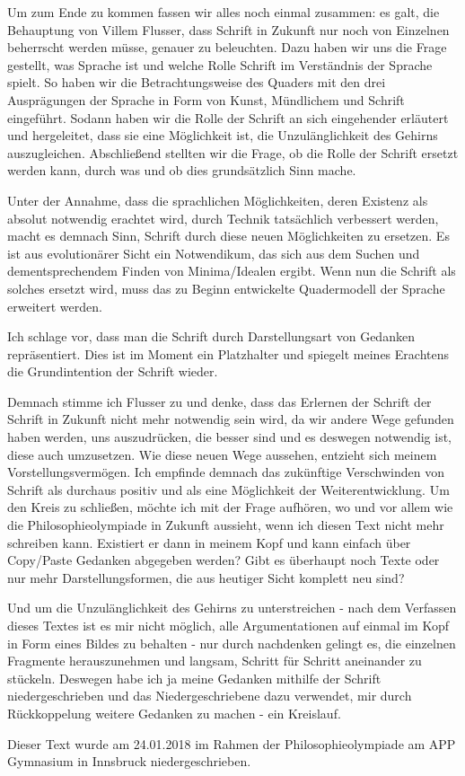 \documentclass[12pt,a4paper,oneside]{article}
\begin{document}
  Um zum Ende zu kommen fassen wir alles noch einmal zusammen: es galt, die Behauptung von Villem Flusser, dass Schrift in Zukunft nur noch von Einzelnen beherrscht werden müsse, genauer zu beleuchten. Dazu haben wir uns die Frage gestellt, was Sprache ist und welche Rolle Schrift im Verständnis der Sprache spielt. So haben wir die Betrachtungsweise des Quaders mit den drei Ausprägungen der Sprache in Form von Kunst, Mündlichem und Schrift eingeführt. Sodann haben wir die Rolle der Schrift an sich eingehender erläutert und hergeleitet, dass sie eine Möglichkeit ist, die Unzulänglichkeit des Gehirns auszugleichen. Abschließend stellten wir die Frage, ob die Rolle der Schrift ersetzt werden kann, durch was und ob dies grundsätzlich Sinn mache.
  
  Unter der Annahme, dass die sprachlichen Möglichkeiten, deren Existenz als absolut notwendig erachtet wird, durch Technik tatsächlich verbessert werden, macht es demnach Sinn, Schrift durch diese neuen Möglichkeiten zu ersetzen. Es ist aus evolutionärer Sicht ein Notwendikum, das sich aus dem Suchen und dementsprechendem Finden von Minima/Idealen ergibt. Wenn nun die Schrift als solches ersetzt wird, muss das zu Beginn entwickelte Quadermodell der Sprache erweitert werden.
  
  Ich schlage vor, dass man die Schrift durch Darstellungsart von Gedanken repräsentiert. Dies ist im Moment ein Platzhalter und spiegelt meines Erachtens die Grundintention der Schrift wieder.
  
  Demnach stimme ich Flusser zu und denke, dass das Erlernen der Schrift der Schrift in Zukunft nicht mehr notwendig sein wird, da wir andere Wege gefunden haben werden, uns auszudrücken, die besser sind und es deswegen notwendig ist, diese auch umzusetzen. Wie diese neuen Wege aussehen, entzieht sich meinem Vorstellungsvermögen. Ich empfinde demnach das zukünftige Verschwinden von Schrift als durchaus positiv und als eine Möglichkeit der Weiterentwicklung. Um den Kreis zu schließen, möchte ich mit der Frage aufhören, wo und vor allem wie die Philosophieolympiade in Zukunft aussieht, wenn ich diesen Text nicht mehr schreiben kann. Existiert er dann in meinem Kopf und kann einfach über Copy/Paste Gedanken abgegeben werden? Gibt es überhaupt noch Texte oder nur mehr Darstellungsformen, die aus heutiger Sicht komplett neu sind?
  
  Und um die Unzulänglichkeit des Gehirns zu unterstreichen - nach dem Verfassen dieses Textes ist es mir nicht möglich, alle Argumentationen auf einmal im Kopf in Form eines Bildes zu behalten - nur durch nachdenken gelingt es, die einzelnen Fragmente herauszunehmen und langsam, Schritt für Schritt aneinander zu stückeln. Deswegen habe ich ja meine Gedanken mithilfe der Schrift niedergeschrieben und das Niedergeschriebene dazu verwendet, mir durch Rückkoppelung weitere Gedanken zu machen - ein Kreislauf.
  
  Dieser Text wurde am 24.01.2018 im Rahmen der Philosophieolympiade am APP Gymnasium in Innsbruck niedergeschrieben.
\end{document}
